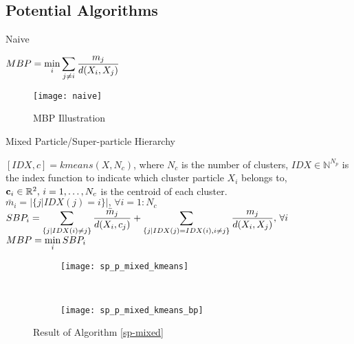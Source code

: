 \subsection{Potential Algorithms}
 \begin{algorithm}
\caption{Naive}
\label{naive}
\begin{algorithmic}[1]
  \State $\displaystyle MBP=\min_i \displaystyle\sum_{j\neq i}\frac{m_j}{d(X_i,X_j)}$
\end{algorithmic} 
 \end{algorithm}
\begin{figure}[H]
\centering
\texttt{[image: naive]}%
\caption{MBP Illustration}
\label{fig:naive}
\end{figure}
 \begin{algorithm}
\caption{Mixed Particle/Super-particle Hierarchy}
\label{sp-mixed}
\begin{algorithmic}[1]
\State $[IDX,c]=kmeans(X,N_c)$, where $N_c$ is  the number of clusters, $IDX\in \mathbb{N}^{N_p}$ is the index function to indicate which cluster particle $X_i$ belongs to, ${\bf c} _i \in \mathbb{R}^{2}, \, i=1,\dots,N_c$ is the centroid of each cluster. 
\State $\bar m_i=|\{j | IDX(j)=i\}|,\,\forall i=1:N_c$
\State $SBP_i=\displaystyle\sum_{\{j|IDX(i)\neq j\}}\frac{\bar m_j}{d(X_i,c_j)}+\displaystyle\sum_{\{j|IDX(j)=IDX(i),i\neq j\}}\frac{m_j}{d(X_i,X_j)},\, \forall i$ 
\State $MBP=\displaystyle\min_i SBP_i$
\EndProcedure
\end{algorithmic} 
 \end{algorithm}
\begin{figure*}[t!]
\centering
\begin{subfigure}[t]{0.5\textwidth}
\centering
\texttt{[image: sp\_p\_mixed\_kmeans]}
\end{subfigure}%
~ 
\begin{subfigure}[t]{0.5\textwidth}
\centering
\texttt{[image: sp\_p\_mixed\_kmeans\_bp]}
\end{subfigure}
\caption{Result of Algorithm \ref{sp-mixed}}
\end{figure*}

